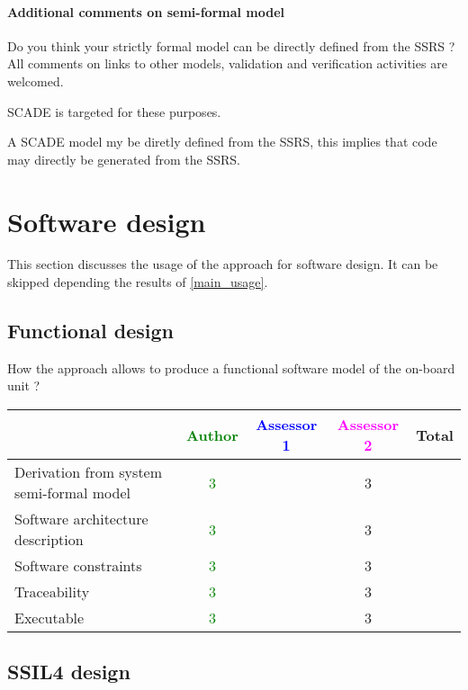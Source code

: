 \paragraph{Additional comments on semi-formal  model} Do you think your strictly formal  model can be directly defined from the SSRS ?
All comments on links to  other models, validation and verification activities are welcomed.

\begin{author_comment}
SCADE is targeted for these purposes.   
\end{author_comment}
\begin{assessor2}
A SCADE model my be diretly defined from the SSRS, this implies that
code may directly be generated from the SSRS.
\end{assessor2}


\section{Software design}
This section discusses the usage of the approach for software design.
It can be skipped depending the results of \ref{main_usage}.

\subsection{Functional design}

How the approach allows to  produce a functional software model of the on-board unit ?

\begin{tabular}{|l | c | c | c | c|}
\hline
& \textcolor{green}{Author} & \textcolor{blue}{Assessor 1} & \textcolor{magenta}{Assessor 2} & Total \\
\hline
Derivation from system semi-formal model  & \textcolor{green}{3} & &3 &  \\
\hline 
Software architecture description  & \textcolor{green}{3} & &3 &  \\
\hline
Software constraints  & \textcolor{green}{3} & &3 &  \\
\hline
Traceability  & \textcolor{green}{3} & &3 &  \\
\hline
Executable  & \textcolor{green}{3} & &3 &  \\
\hline
\end{tabular}

\subsection{SSIL4 design}

